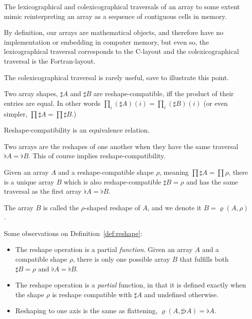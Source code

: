 \documentclass{DIKU-report-variant}
\begin{document}
\begin{observation}
  \label{ob:c-fortran-order}
  The lexicographical and colexicographical traversals of an array to some extent
  mimic reinterpreting an array as a sequence of contiguous cells in memory.

  By definition, our arrays are mathematical objects, and therefore have no
  implementation or embedding in computer memory, but even so, the lexicographical
  traversal corresponds to the C-layout and the colexicographical
  traversal is the Fortran-layout.

  The colexicographical traversal is rarely useful, save to illustrate
  this point.
\end{observation}

\begin{definition}
  \label{def:reshape-comp} 
  Two array shapes, \(\sharp A\) and \(\sharp B\) are reshape-compatible, iff the product
  of their entries are equal. In other words
  \(\prod_{i} (\sharp A)(i) = \prod_{i} (\sharp B)(i)\) (or even simpler,
  \(\prod \sharp A = \prod \sharp B\).)

  Reshape-compatibility is an equivalence relation.
\end{definition}

\begin{definition}
  \label{def:reshape-equiv}
  Two arrays are the reshapes of one another when they have the same traversal
  \(\flat A = \flat B\). This of course implies reshape-compatibility.
\end{definition}

\begin{definition}
  \label{def:reshape}
  Given an array \(A\) and a reshape-compatible shape \(\rho\), meaning \(\prod \sharp A = \prod\rho\),
  there is a unique array \(B\) which is also reshape-compatible \(\sharp B = \rho\) and
  has the same traversal as the first array \(\flat A = \flat B\).
  
  The array \(B\) is called the \(\rho\)-shaped reshape of \(A\), and we denote
  it \(B = \varrho(A, \rho)\).
\end{definition}

\begin{observation}
  \label{ob:reshape}
  Some observations on Definition~\ref{def:reshape}:
  \begin{itemize}
    \item The reshape operation is a partial \emph{function}. Given an array \(A\) and a compatible
      shape \(\rho\), there is only one possible array \(B\) that fulfills
      both \(\sharp B = \rho\) and \(\flat A = \flat B\).
    \item The reshape operation is a \emph{partial} function, in that it is defined exactly when the
      shape \(\rho\) is reshape compatible with \(\sharp A\) and undefined otherwise.
    \item Reshaping to one axis is the same as flattening, \(\varrho(A, \sharp \flat A) = \flat A\).
  \end{itemize}
\end{observation}
\end{document}
